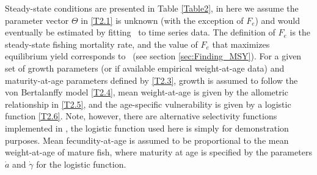 Steady-state conditions are presented in Table \ref{Table2}, in here we assume the parameter vector $\Theta$ in \eqref{T2.1} is unknown (with the exception of $F_e$) and would eventually be estimated by fitting \iscam\ to time series data. The definition of $F_e$ is the steady-state fishing mortality rate, and the value of $F_e$ that maximizes equilibrium yield corresponds to \fmsy\ (see section \ref{sec:Finding_MSY}).   For a given set of growth parameters (or if available empirical weight-at-age data) and maturity-at-age parameters defined by \eqref{T2.3}, growth is assumed to follow the von Bertalanffy model \eqref{T2.4}, mean weight-at-age is given by the allometric relationship in \eqref{T2.5}, and the age-specific vulnerability is given by a logistic function \eqref{T2.6}.  Note, however, there are alternative selectivity functions implemented in \iscam, the logistic function used here is simply for demonstration purposes.  Mean fecundity-at-age is assumed to be proportional to the mean weight-at-age of mature fish, where maturity at age is specified by the parameters $\dot{a}$ and $\dot{\gamma}$ for the logistic function.

 

